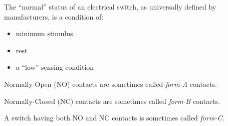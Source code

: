 
The ``normal'' status of an electrical switch, as universally defined by manufacturers, is a condition of:

\begin{itemize}
\item{} minimum stimulus
\item{} rest
\item{} a ``low'' sensing condition
\end{itemize}

Normally-Open (NO) contacts are sometimes called {\it form-A} contacts.

\vskip 10pt

Normally-Closed (NC) contacts are sometimes called {\it form-B} contacts.

\vskip 10pt

A switch having both NO and NC contacts is sometimes called {\it form-C}.






